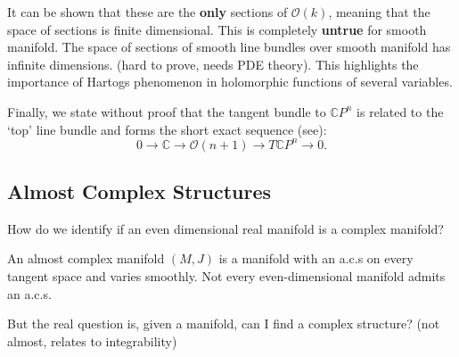 It can be shown that these are the \textbf{only} sections of $\mathcal{O}(k)$, meaning that the space of sections is finite dimensional. This is completely \textbf{untrue} for smooth manifold. The space of sections of smooth line bundles over smooth manifold has infinite dimensions. (hard to prove, needs PDE theory).
This highlights the importance of Hartogs phenomenon in holomorphic functions of several variables.

Finally, we state without proof that the tangent bundle to $\mathbb{C}P^n$ is related to the `top' line bundle and forms the short exact sequence (see\citep{Hori}):
\begin{equation}
    0 \rightarrow \mathbb{C} \rightarrow \mathcal{O}(n+1) \rightarrow T \mathbb{C}P^n \rightarrow0.
\end{equation}
% 
\subsection{Almost Complex Structures} %
\label{sub:almost_complex_structures}
How do we identify if an even dimensional real manifold is a complex manifold?

An almost complex manifold $(M,J)$ is a manifold with an a.c.s on every tangent space and varies smoothly. Not every even-dimensional manifold admits an a.c.s.

But the real question is, given a manifold, can I find a complex structure? (not almost, relates to integrability)
% 
